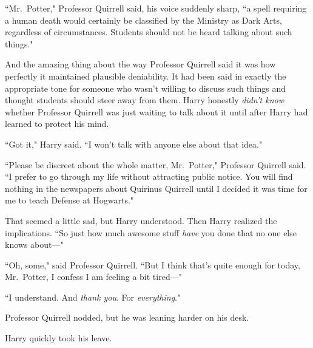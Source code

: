 ``Mr.~Potter," Professor Quirrell said, his voice suddenly sharp, ``a spell requiring a human death would certainly be classified by the Ministry as Dark Arts, regardless of circumstances. Students should not be heard talking about such things."

And the amazing thing about the way Professor Quirrell said it was how perfectly it maintained plausible deniability. It had been said in exactly the appropriate tone for someone who wasn't willing to discuss such things and thought students should steer away from them. Harry honestly \emph{didn't know} whether Professor Quirrell was just waiting to talk about it until after Harry had learned to protect his mind.

``Got it," Harry said. ``I won't talk with anyone else about that idea."

``Please be discreet about the whole matter, Mr.~Potter," Professor Quirrell said. ``I prefer to go through my life without attracting public notice. You will find nothing in the newspapers about Quirinus Quirrell until I decided it was time for me to teach Defense at Hogwarts."

That seemed a little sad, but Harry understood. Then Harry realized the implications. ``So just how much awesome stuff \emph{have} you done that no one else knows about—"

``Oh, some," said Professor Quirrell. ``But I think that's quite enough for today, Mr.~Potter, I confess I am feeling a bit tired—"

``I understand. And \emph{thank you}. For \emph{everything}."

Professor Quirrell nodded, but he was leaning harder on his desk.

Harry quickly took his leave.

